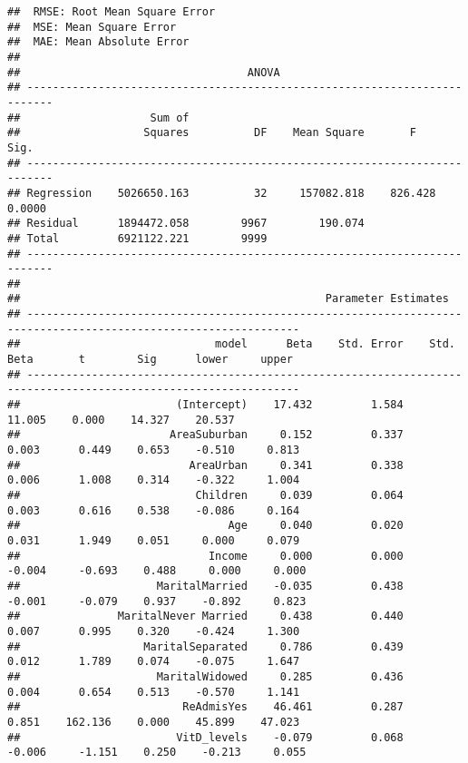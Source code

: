 \documentclass[
]{article}
\begin{document}
\begin{verbatim}
##  RMSE: Root Mean Square Error 
##  MSE: Mean Square Error 
##  MAE: Mean Absolute Error 
## 
##                                   ANOVA                                    
## --------------------------------------------------------------------------
##                    Sum of                                                 
##                   Squares          DF    Mean Square       F         Sig. 
## --------------------------------------------------------------------------
## Regression    5026650.163          32     157082.818    826.428    0.0000 
## Residual      1894472.058        9967        190.074                      
## Total         6921122.221        9999                                     
## --------------------------------------------------------------------------
## 
##                                               Parameter Estimates                                                
## ----------------------------------------------------------------------------------------------------------------
##                              model      Beta    Std. Error    Std. Beta       t        Sig      lower     upper 
## ----------------------------------------------------------------------------------------------------------------
##                        (Intercept)    17.432         1.584                  11.005    0.000    14.327    20.537 
##                       AreaSuburban     0.152         0.337        0.003      0.449    0.653    -0.510     0.813 
##                          AreaUrban     0.341         0.338        0.006      1.008    0.314    -0.322     1.004 
##                           Children     0.039         0.064        0.003      0.616    0.538    -0.086     0.164 
##                                Age     0.040         0.020        0.031      1.949    0.051     0.000     0.079 
##                             Income     0.000         0.000       -0.004     -0.693    0.488     0.000     0.000 
##                     MaritalMarried    -0.035         0.438       -0.001     -0.079    0.937    -0.892     0.823 
##               MaritalNever Married     0.438         0.440        0.007      0.995    0.320    -0.424     1.300 
##                   MaritalSeparated     0.786         0.439        0.012      1.789    0.074    -0.075     1.647 
##                     MaritalWidowed     0.285         0.436        0.004      0.654    0.513    -0.570     1.141 
##                         ReAdmisYes    46.461         0.287        0.851    162.136    0.000    45.899    47.023 
##                        VitD_levels    -0.079         0.068       -0.006     -1.151    0.250    -0.213     0.055 

\end{verbatim}
\end{document}
